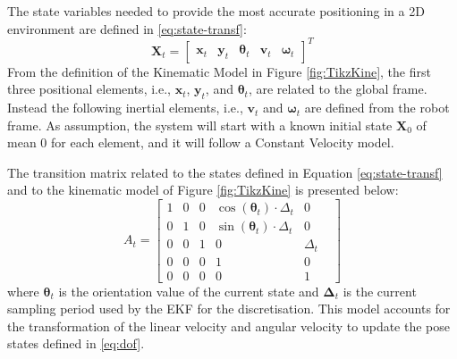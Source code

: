 The state variables needed to provide the most accurate positioning in a \gls{2D} environment are defined in \eqref{eq:state-transf}:
\begin{equation}
	\label{eq:state-transf}
	\mathbf{X}_t =
	\begin{bmatrix}
		\mathbf{x}_t & \mathbf{y}_t & \boldsymbol \theta_t & \mathbf{v}_t & \boldsymbol \omega_t
	\end{bmatrix} ^T
\end{equation}
From the definition of the Kinematic Model in Figure \ref{fig:TikzKine}, the first three positional elements, i.e., $\mathbf{x}_t$, $\mathbf{y}_t$, and $\boldsymbol \theta_t$, are related to the global frame. 
Instead the following inertial elements, i.e., $\mathbf{v}_t$ and $\boldsymbol \omega_t$ are defined from the robot frame.
As assumption, the system will start with a known initial state $\mathbf{X}_0$ of mean $0$ for each element, and it will follow a Constant Velocity model.

The transition matrix related to the states defined in Equation \eqref{eq:state-transf} and to the kinematic model of Figure \ref{fig:TikzKine} is presented below:
\begin{equation}
	\label{eq:trans-mat}
	A_t
	=
	\begin{bmatrix}
		1 & 0 & 0 & \cos(\boldsymbol \theta_t) \cdot \Delta_t & 0 \\
		0 & 1 & 0 & \sin(\boldsymbol \theta_t) \cdot \Delta_t & 0 \\
		0 & 0 & 1 & 0 & \Delta_t  \\
		0 & 0 & 0 & 1 & 0 \\
		0 & 0 & 0 & 0 & 1 & 
	\end{bmatrix}
\end{equation}
where $\boldsymbol \theta_t$ is the orientation value of the current state and $\boldsymbol \Delta_t$ is the current sampling period used by the \gls{EKF} for the discretisation.
This model accounts for the transformation of the linear velocity and angular velocity to update the pose states defined in \eqref{eq:dof}.

